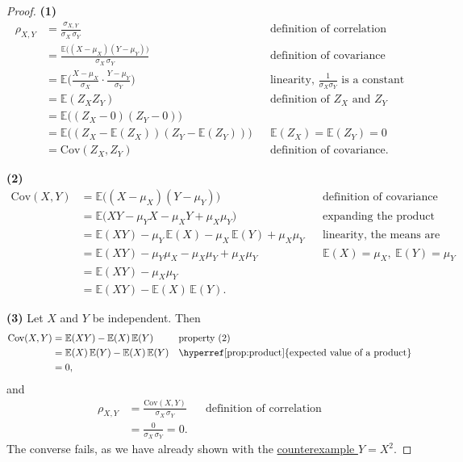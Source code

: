\documentclass[a4paper,12pt,oneside]{report}
\begin{document}
\begin{proof}
\textbf{(1)}
\begin{align*}
\rho_{X,Y}
&=\frac{\sigma_{X,Y}}{\sigma_X\,\sigma_Y}
&&\text{definition of correlation}\\
&=\frac{\mathbb{E}\big((X-\mu_X)(Y-\mu_Y)\big)}{\sigma_X\,\sigma_Y}
&&\text{definition of covariance}\\
&=\mathbb{E}\Big(\frac{X-\mu_X}{\sigma_X}\cdot\frac{Y-\mu_Y}{\sigma_Y}\Big)
&&\text{linearity, $\tfrac{1}{\sigma_X\sigma_Y}$ is a constant}\\
&=\mathbb{E}(Z_XZ_Y)
&&\text{definition of $Z_X$ and $Z_Y$}\\
&=\mathbb{E}\big((Z_X-0)(Z_Y-0)\big)\\
&=\mathbb{E}\big((Z_X-\mathbb{E}(Z_X))(Z_Y-\mathbb{E}(Z_Y))\big)
&&\mathbb{E}(Z_X)=\mathbb{E}(Z_Y)=0\\
&=\mathrm{Cov}(Z_X,Z_Y)
&&\text{definition of covariance.}
\end{align*}

\textbf{(2)}
\begin{align*}
\mathrm{Cov}(X,Y)
&=\mathbb{E}\big((X-\mu_X)(Y-\mu_Y)\big)
&&\text{definition of covariance}\\
&=\mathbb{E}\big(XY-\mu_YX-\mu_XY+\mu_X\mu_Y\big)
&&\text{expanding the product}\\
&=\mathbb{E}(XY)-\mu_Y\,\mathbb{E}(X)-\mu_X\,\mathbb{E}(Y)+\mu_X\mu_Y
&&\text{linearity, the means are constants}\\
&=\mathbb{E}(XY)-\mu_Y\mu_X-\mu_X\mu_Y+\mu_X\mu_Y
&&\mathbb{E}(X)=\mu_X,\ \mathbb{E}(Y)=\mu_Y\\
&=\mathbb{E}(XY)-\mu_X\mu_Y\\
&=\mathbb{E}(XY)-\mathbb{E}(X)\,\mathbb{E}(Y).
\end{align*}

\textbf{(3)} Let $X$ and $Y$ be independent. Then
\begin{align*}
\mathrm{Cov}(X,Y)
&=\mathbb{E}(XY)-\mathbb{E}(X)\,\mathbb{E}(Y)
&&\text{property (2)}\\
&=\mathbb{E}(X)\,\mathbb{E}(Y)-\mathbb{E}(X)\,\mathbb{E}(Y)
&&\text{\hyperref[prop:product]{expected value of a product}}\\
&=0,
\end{align*}
and
\begin{align*}
\rho_{X,Y}
&=\frac{\mathrm{Cov}(X,Y)}{\sigma_X\,\sigma_Y}
&&\text{definition of correlation}\\
&=\frac{0}{\sigma_X\,\sigma_Y}=0 .
\end{align*}
The converse fails, as we have already shown with the
\hyperref[note:cov-converse]{counterexample $Y=X^2$}.


\end{proof}
\end{document}
